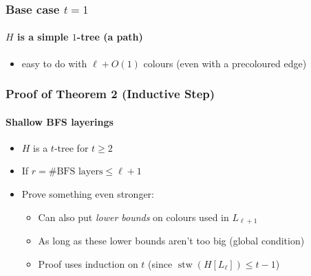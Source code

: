 \documentclass[xcolor=dvipsnames]{beamer}
\DeclareMathOperator{\stw}{stw}
\begin{document}
\begin{frame}
  \frametitle{Base case $t=1$}
  \framesubtitle{$H$ is a simple $1$-tree (a path)}

  \begin{itemize}
    \item easy to do with $\ell+O(1)$ colours (even with a precoloured edge)
  \end{itemize}
  \begin{center}
  \end{center}
\end{frame}

\begin{frame}
  \frametitle{Proof of Theorem 2 (Inductive Step)}
  \framesubtitle{Shallow BFS layerings}

  \begin{itemize}
      \item $H$ is a $t$-tree for $t\ge 2$
      \item If $r=\text{\# BFS layers}\le \ell+1$
      \item<2->Prove something even stronger:
      \begin{itemize}
        \item Can also put \emph{lower bounds} on colours used in $L_{\ell+1}$
        \item As long as these lower bounds aren't too big (global condition)
        \item<3-> Proof uses induction on $t$ (since $\stw(H[L_\ell])\le t-1$)
      \end{itemize}
  \end{itemize}
  \begin{center}
  \end{center}
\end{frame}
\end{document}

